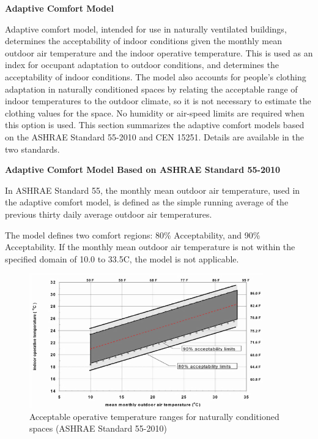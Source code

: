 \textbf{Adaptive Comfort Model}

Adaptive comfort model, intended for use in naturally ventilated buildings, determines the acceptability of indoor conditions given the monthly mean outdoor air temperature and the indoor operative temperature. This is used as an index for occupant adaptation to outdoor conditions, and determines the acceptability of indoor conditions. The model also accounts for people's clothing adaptation in naturally conditioned spaces by relating the acceptable range of indoor temperatures to the outdoor climate, so it is not necessary to estimate the clothing values for the space. No humidity or air-speed limits are required when this option is used. This section summarizes the adaptive comfort models based on the ASHRAE Standard 55-2010 and CEN 15251. Details are available in the two standards.

\textbf{Adaptive Comfort Model Based on ASHRAE Standard 55-2010}

In ASHRAE Standard 55, the monthly mean outdoor air temperature, used in the adaptive comfort model, is defined as the simple running average of the previous thirty daily average outdoor air temperatures.

The model defines two comfort regions: 80\% Acceptability, and 90\% Acceptability. If the monthly mean outdoor air temperature is not within the specified domain of 10.0 to 33.5C, the model is not applicable.

\begin{figure}[hbtp] %
\centering
\includegraphics[width=0.9\textwidth, height=0.9\textheight, keepaspectratio=true]{media/image6814.png}
\caption{Acceptable operative temperature ranges for naturally conditioned spaces (ASHRAE Standard 55-2010) \protect \label{fig:acceptable-operative-temperature-ranges-for}}
\end{figure}

